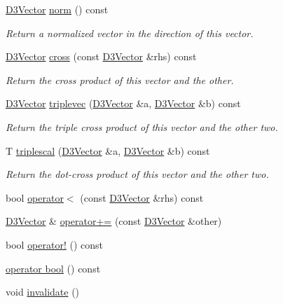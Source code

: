 \begin{DoxyCompactItemize}
\hyperlink{class_wire_cell_1_1_d3_vector}{D3\+Vector} \hyperlink{class_wire_cell_1_1_d3_vector_a9cff9bf6015c3f7742d4fae7aac7c4a5}{norm} () const
\begin{DoxyCompactList}\small\item\em Return a normalized vector in the direction of this vector. \end{DoxyCompactList}\item 
\hyperlink{class_wire_cell_1_1_d3_vector}{D3\+Vector} \hyperlink{class_wire_cell_1_1_d3_vector_a23dc4ec801eb35c96d5843d1beed8bd2}{cross} (const \hyperlink{class_wire_cell_1_1_d3_vector}{D3\+Vector} \&rhs) const
\begin{DoxyCompactList}\small\item\em Return the cross product of this vector and the other. \end{DoxyCompactList}\item 
\hyperlink{class_wire_cell_1_1_d3_vector}{D3\+Vector} \hyperlink{class_wire_cell_1_1_d3_vector_ad88cac8d3f57beaddacfc20ecbc76707}{triplevec} (\hyperlink{class_wire_cell_1_1_d3_vector}{D3\+Vector} \&a, \hyperlink{class_wire_cell_1_1_d3_vector}{D3\+Vector} \&b) const
\begin{DoxyCompactList}\small\item\em Return the triple cross product of this vector and the other two. \end{DoxyCompactList}\item 
T \hyperlink{class_wire_cell_1_1_d3_vector_ac656a3772a15e4a7db4393a9ffe576c1}{triplescal} (\hyperlink{class_wire_cell_1_1_d3_vector}{D3\+Vector} \&a, \hyperlink{class_wire_cell_1_1_d3_vector}{D3\+Vector} \&b) const
\begin{DoxyCompactList}\small\item\em Return the dot-\/cross product of this vector and the other two. \end{DoxyCompactList}\item 
bool \hyperlink{class_wire_cell_1_1_d3_vector_aa891af0e402dcbcbe178fe1b6bc5ed44}{operator$<$} (const \hyperlink{class_wire_cell_1_1_d3_vector}{D3\+Vector} \&rhs) const
\item 
\hyperlink{class_wire_cell_1_1_d3_vector}{D3\+Vector} \& \hyperlink{class_wire_cell_1_1_d3_vector_a8a235eba65334ae4a2ff5e22bc58b815}{operator+=} (const \hyperlink{class_wire_cell_1_1_d3_vector}{D3\+Vector} \&other)
\item 
bool \hyperlink{class_wire_cell_1_1_d3_vector_a1800f3c26224e1e4d35d81752046c3c3}{operator!} () const
\item 
\hyperlink{class_wire_cell_1_1_d3_vector_ac7393e217cc1d10e385b27fd40e70e0b}{operator bool} () const
\item 
void \hyperlink{class_wire_cell_1_1_d3_vector_a19020cb989bd6b3b8d8948db885f5811}{invalidate} ()
\end{DoxyCompactItemize}
